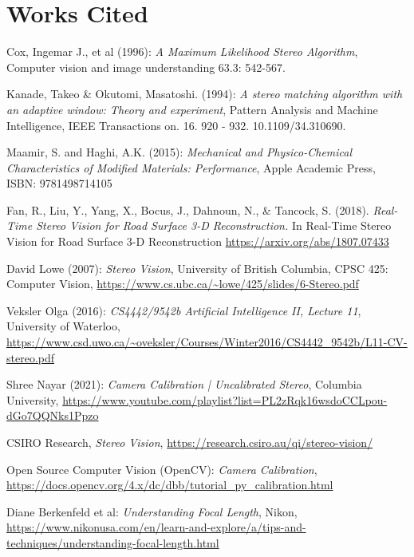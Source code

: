 \documentclass[11pt]{scrartcl}
\begin{document}
\section{Works Cited}
\renewcommand{\section}[2]{}%
\begin{thebibliography}{9}

Cox, Ingemar J., et al (1996): \emph{A Maximum Likelihood Stereo Algorithm}, Computer vision and image understanding 63.3: 542-567.

Kanade, Takeo & Okutomi, Masatoshi. (1994):  \emph{A stereo matching algorithm with an adaptive window: Theory and experiment}, Pattern Analysis and Machine Intelligence, IEEE Transactions on. 16. 920 - 932. 10.1109/34.310690. 

Maamir, S. and Haghi, A.K. (2015): \emph{Mechanical and Physico-Chemical Characteristics of Modified Materials: Performance}, Apple Academic Press,
ISBN: 9781498714105

Fan, R., Liu, Y., Yang, X., Bocus, J., Dahnoun, N., & Tancock, S. (2018). \emph{Real-Time Stereo Vision for Road Surface 3-D Reconstruction.} In Real-Time Stereo Vision for Road Surface 3-D Reconstruction \url{https://arxiv.org/abs/1807.07433}

David Lowe (2007): \emph{Stereo Vision}, University of British Columbia, CPSC 425: Computer Vision, 
\url{https://www.cs.ubc.ca/~lowe/425/slides/6-Stereo.pdf}

Veksler Olga  (2016): \emph{CS4442/9542b Artificial Intelligence II, Lecture 11}, University of Waterloo,
\url{https://www.csd.uwo.ca/~oveksler/Courses/Winter2016/CS4442_9542b/L11-CV-stereo.pdf}

Shree Nayar (2021): \emph{Camera Calibration | Uncalibrated Stereo}, Columbia University, 
\url{https://www.youtube.com/playlist?list=PL2zRqk16wsdoCCLpou-dGo7QQNks1Ppzo}

  CSIRO Research,
  \textit{Stereo Vision}, \url{https://research.csiro.au/qi/stereo-vision/}
  
Open Source Computer Vision (OpenCV): \emph{Camera Calibration},
\url{https://docs.opencv.org/4.x/dc/dbb/tutorial_py_calibration.html}

Diane Berkenfeld et al: \emph{Understanding Focal Length}, Nikon,
\url{https://www.nikonusa.com/en/learn-and-explore/a/tips-and-techniques/understanding-focal-length.html}


\end{thebibliography}
\end{document}
